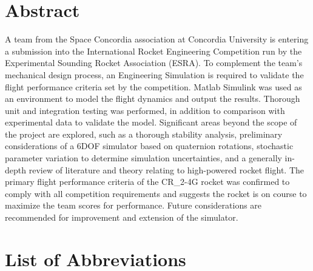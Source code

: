 \documentclass[]{book}
\begin{document}
\section*{Abstract}
A team from the Space Concordia association at Concordia University is
entering a submission into the International Rocket Engineering
Competition run by the Experimental Sounding Rocket Association (ESRA).
To complement the team's mechanical design process, an Engineering
Simulation is required to validate the flight performance criteria set
by the competition. Matlab Simulink was used as an environment to model
the flight dynamics and output the results. Thorough unit and
integration testing was performed, in addition to comparison with
experimental data to validate the model. Significant areas beyond the
scope of the project are explored, such as a thorough stability
analysis, preliminary considerations of a 6DOF simulator based on
quaternion rotations, stochastic parameter variation to determine
simulation uncertainties, and a generally in-depth review of literature
and theory relating to high-powered rocket flight. The primary flight
performance criteria of the CR\_2-4G rocket was confirmed to comply with
all competition requirements and suggests the rocket is on course to
maximize the team scores for performance. Future considerations are
recommended for improvement and extension of the simulator.
\clearpage

{
\hypersetup{linkcolor=black}
\setcounter{tocdepth}{2}
\tableofcontents
\clearpage
}


\listoftables
\listoffigures
\clearpage
\section{List of Abbreviations}\label{list-of-abbreviations}
\end{document}
